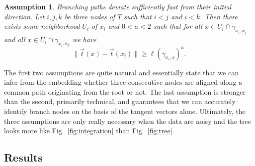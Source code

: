 \documentclass[pdflatex,sn-mathphys-num]{sn-jnl}%
\theoremstyle{thmstyleone}%
\newtheorem{assumption}{Assumption}
\theoremstyle{thmstyletwo}%
\theoremstyle{thmstylethree}%
\begin{document}
\begin{assumption}
\label{A3}
Branching paths deviate sufficiently fast from their initial direction. Let $i, j, k$ be three nodes of $T$ such that $i < j$ and $i<k$. Then there exists some neighborhood $U_i$ of $x_i$ and $0 < a < 2$ such that for all $x \in U_i \cap \gamma_{x_i, x_j}$ and all $x \in U_i\cap\gamma_{x_i, x_k}$ we have
\begin{equation*}
    \|\vec{t}(x) - \vec{t}(x_i)\| \geq \ell(\gamma_{x_i, x})^a.
\end{equation*}
\end{assumption}
The first two assumptions are quite natural and essentially state that we can infer from the embedding whether three consecutive nodes are aligned along a common path originating from the root or not. The last assumption is stronger than the second, primarily technical, and guarantees that we can accurately identify branch nodes on the basis of the tangent vectors alone. Ultimately, the three assumptions are only really necessary when the data are noisy and the tree looks more like Fig.~\ref{fig:integration} than Fig.~\ref{fig:tree}.

\subsection{Results}
\end{document}
